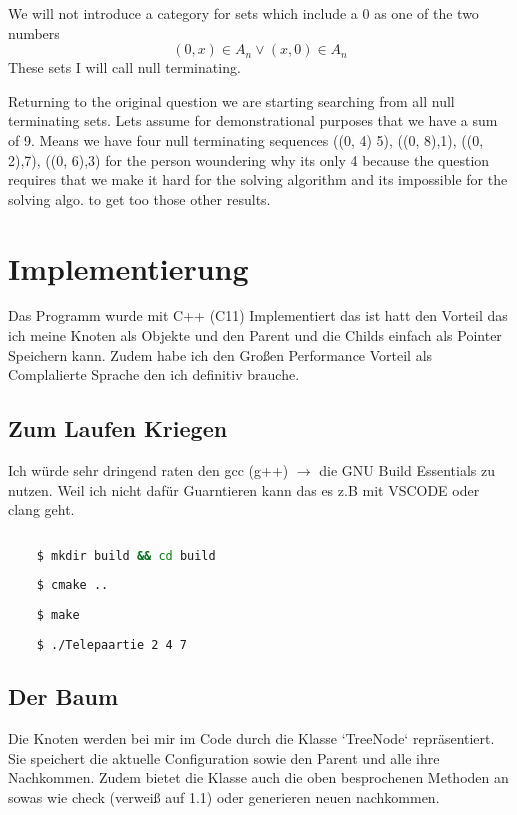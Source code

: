 \documentclass{article}
\begin{document}
We will not introduce a category for sets which include a 0 as one of the two numbers
\begin{equation}
	(0, x) \in A_n \vee (x, 0) \in A_n
\end{equation}
These sets I will call null terminating.

Returning to the original question we are starting searching from all null terminating sets. Lets assume for demonstrational purposes that we have a sum of 9. Means we have four null terminating sequences ((0, 4) 5), ((0, 8),1), ((0, 2),7), ((0, 6),3) for the person woundering why its only 4 because the question requires that we make it hard for the solving algorithm and its impossible for the solving algo. to get too those other results.


\section{ Implementierung }
Das Programm wurde mit C++ (C11) Implementiert das ist hatt den Vorteil das ich meine Knoten als Objekte und den Parent und die Childs einfach als Pointer Speichern kann. Zudem habe ich den Großen Performance Vorteil als Complalierte Sprache den ich definitiv brauche.

\subsection*{ Zum Laufen Kriegen }

Ich würde sehr dringend raten den gcc (g++) \(\rightarrow\) die GNU Build Essentials zu nutzen. Weil ich nicht dafür Guarntieren kann das es z.B mit VSCODE oder clang geht.

\begin{lstlisting}[language=Bash]
	
	$ mkdir build && cd build
	
	$ cmake ..
	
	$ make
	
	$ ./Telepaartie 2 4 7

\end{lstlisting}

\subsection*{ Der Baum }

Die Knoten werden bei mir im Code durch die Klasse `TreeNode` repräsentiert. Sie speichert die aktuelle Configuration sowie den Parent und alle ihre Nachkommen. Zudem bietet die Klasse auch die oben besprochenen Methoden an sowas wie check (verweiß auf 1.1) oder generieren neuen nachkommen.
\end{document}
